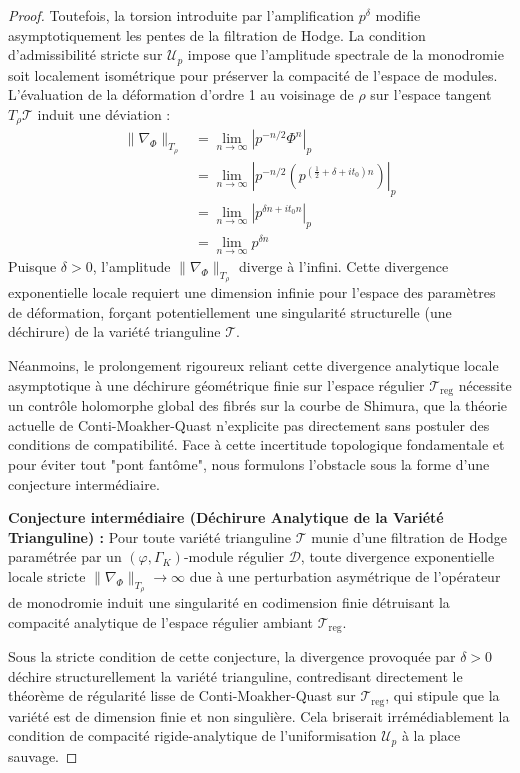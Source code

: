 \documentclass[
]{article}
\begin{document}
\begin{proof}
Toutefois, la torsion introduite par l'amplification $p^{\delta}$ modifie asymptotiquement les pentes de la filtration de Hodge. La condition d'admissibilité stricte sur $\mathcal{U}_p$ impose que l'amplitude spectrale de la monodromie soit localement isométrique pour préserver la compacité de l'espace de modules. L'évaluation de la déformation d'ordre 1 au voisinage de $\rho$ sur l'espace tangent $T_{\rho} \mathcal{T}$ induit une déviation :
\begin{align*}
    \| \nabla_{\Phi} \|_{T_{\rho}} &= \lim_{n \to \infty} \left| p^{-n/2} \Phi^n \right|_p \\
    &= \lim_{n \to \infty} \left| p^{-n/2} \left( p^{(\frac{1}{2} + \delta + it_0)n} \right) \right|_p \\
    &= \lim_{n \to \infty} \left| p^{\delta n + it_0 n} \right|_p \\
    &= \lim_{n \to \infty} p^{\delta n}
\end{align*}
Puisque $\delta > 0$, l'amplitude $\| \nabla_{\Phi} \|_{T_{\rho}}$ diverge à l'infini. Cette divergence exponentielle locale requiert une dimension infinie pour l'espace des paramètres de déformation, forçant potentiellement une singularité structurelle (une déchirure) de la variété trianguline $\mathcal{T}$.

Néanmoins, le prolongement rigoureux reliant cette divergence analytique locale asymptotique à une déchirure géométrique finie sur l'espace régulier $\mathcal{T}_{\text{reg}}$ nécessite un contrôle holomorphe global des fibrés sur la courbe de Shimura, que la théorie actuelle de Conti-Moakher-Quast n'explicite pas directement sans postuler des conditions de compatibilité. Face à cette incertitude topologique fondamentale et pour éviter tout "pont fantôme", nous formulons l'obstacle sous la forme d'une conjecture intermédiaire.

\textbf{Conjecture intermédiaire (Déchirure Analytique de la Variété Trianguline) :} Pour toute variété trianguline $\mathcal{T}$ munie d'une filtration de Hodge paramétrée par un $(\varphi,\Gamma_K)$-module régulier $\mathcal{D}$, toute divergence exponentielle locale stricte $\| \nabla_{\Phi} \|_{T_{\rho}} \to \infty$ due à une perturbation asymétrique de l'opérateur de monodromie induit une singularité en codimension finie détruisant la compacité analytique de l'espace régulier ambiant $\mathcal{T}_{\text{reg}}$.

Sous la stricte condition de cette conjecture, la divergence provoquée par $\delta > 0$ déchire structurellement la variété trianguline, contredisant directement le théorème de régularité lisse de Conti-Moakher-Quast sur $\mathcal{T}_{\text{reg}}$, qui stipule que la variété est de dimension finie et non singulière. Cela briserait irrémédiablement la condition de compacité rigide-analytique de l'uniformisation $\mathcal{U}_p$ à la place sauvage.


\end{proof}
\end{document}
